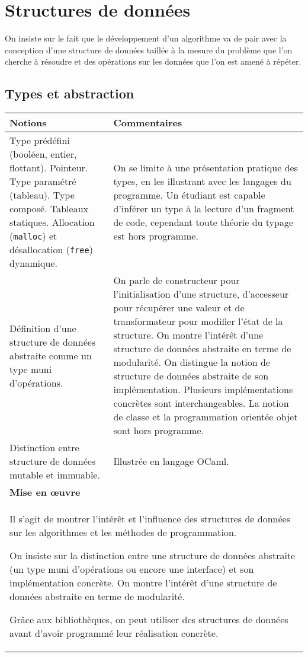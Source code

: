 \section{Structures de données \semUn \semDeux \semTroisQuatre}

On insiste sur le fait que le développement d'un algorithme va de pair avec la conception d'une structure de données taillée à la mesure du problème que l'on cherche à résoudre et des opérations sur les données que l'on est amené à répéter.



\subsection{Types et abstraction \semUn}


\begin{longtable}{|p{\lnotion}|p{\comment}|}
    \hline
    \textbf{Notions} & \textbf{Commentaires} \\
    \hline \hline
    Type prédéfini (booléen, entier, flottant). Pointeur. Type paramétré (tableau). Type composé. Tableaux statiques. Allocation (\texttt{malloc}) et désallocation (\texttt{free}) dynamique.
    &
    On se limite à une présentation pratique des types, en les illustrant avec les langages du programme. Un étudiant est capable d'inférer un type à la lecture d'un fragment de code, cependant toute théorie du typage est hors programme.
    \\
    \hline
    Définition d'une structure de données abstraite comme un type muni d'opérations. 
    & 
    On parle de constructeur pour l'initialisation d'une structure, d'accesseur pour récupérer une valeur et de transformateur pour modifier l'état de la structure. On montre l'intérêt d'une structure de données abstraite en terme de modularité. On distingue la notion de structure de données abstraite de son implémentation. Plusieurs implémentations concrètes sont interchangeables.
    La notion de classe et la programmation orientée objet sont hors programme. 
    \\
    \hline
    Distinction entre structure de données mutable et immuable.
    &
    Illustrée en langage OCaml.
    \\
    \hline \hline
    \multicolumn{2}{|p{\lmoe}|}{\textbf{Mise en œuvre}} \\
    \hline
    \multicolumn{2}{|p{\lmoe}|}{
    Il s'agit de montrer l'intérêt et l'influence des structures de données sur les algorithmes et les méthodes de programmation. 
    
    On insiste sur la distinction entre une structure de données abstraite (un type muni d'opérations ou encore une interface) et son implémentation concrète. On montre l'intérêt d'une structure de données abstraite en terme de modularité.
        
    Grâce aux bibliothèques, on peut utiliser des structures de données avant d'avoir programmé leur réalisation concrète.
    } \\
    \hline
\end{longtable}

